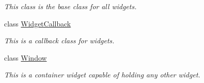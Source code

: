 \begin{DoxyCompactItemize}
\begin{DoxyCompactList}\small\item\em This class is the base class for all widgets. \item\end{DoxyCompactList}\item 
class \hyperlink{classMezzanine_1_1UI_1_1WidgetCallback}{WidgetCallback}
\begin{DoxyCompactList}\small\item\em This is a callback class for widgets. \item\end{DoxyCompactList}\item 
class \hyperlink{classMezzanine_1_1UI_1_1Window}{Window}
\begin{DoxyCompactList}\small\item\em This is a container widget capable of holding any other widget. \item\end{DoxyCompactList}\end{DoxyCompactItemize}
